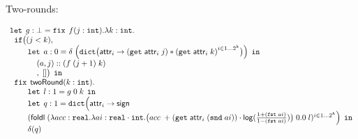 \begin{figure}
\small
Two-rounds:



\[
\begin{array}{l}
  \mathop{\mathtt{let}} \;  g: \bot = 
  \mathop{\mathtt{fix}} \; f(j: \mathtt{int}). \lambda k: \mathtt{int}.\\
  \hspace{.2cm}  \mathtt{if} \big (  (j < k)  ,  \\
  \hspace{.8cm}  \mathop{\mathtt{let}} \;  a: 0 = 
                 \delta \;  
             \Big(\mathtt{dict} 
             \big({\mathsf{attr}_i \to (\mathtt{get} \; \mathsf{attr}_i \; j) * (\mathtt{get} \; \mathsf{attr}_i \;  k)}^{i \in 1\dots 2^k} 
             \big) 
             \Big) 
                  \; \mathop{ \mathtt{in}} \\
  \hspace{1.2cm} (a, j) :: (f  \; (j+1) \;  k) \\
  \hspace{1.2cm} ,\;  [] \big) \; \mathop{ \mathtt{in}}\\
  \hspace{.2cm}  \mathop{\mathtt{fix}} \; \mathsf{twoRound}(k : \mathtt{int}). 
                 \\
  \hspace{.8cm}  \mathop{\mathtt{let}} \;  l: 1 = g \;  0 \;  k  \;  \mathop{ \mathtt{in}} \\
  \hspace{.8cm}  \mathop{\mathtt{let}} \;  q: 1 = \mathtt{dict} 
  \Big(\mathsf{attr}_i \to
                    \mathsf{sign} \; \\ 
  \hspace{.8cm}  (\mathsf{foldl} \;  (\lambda acc: \mathtt{real}. 
                 \lambda ai: \mathtt{real} \cdot \mathtt{int}. 
                 \big(acc\; + (\mathtt{get} \; \mathsf{attr}_i \;  (\mathtt{snd} \; ai)) 
                 \cdot \mathsf{log}(\frac{1+ (\mathtt{fst} \; ai) }{1- (\mathtt{fst} \; ai)}) 
                 \big)
                 \;  0.0 \;  l )^{i \in 1\dots 2^k} \Big) \;  \mathop{ \mathtt{in}} \\
  \hspace{.8cm}  \delta ( q )
\end{array}
\]
\end{figure}



